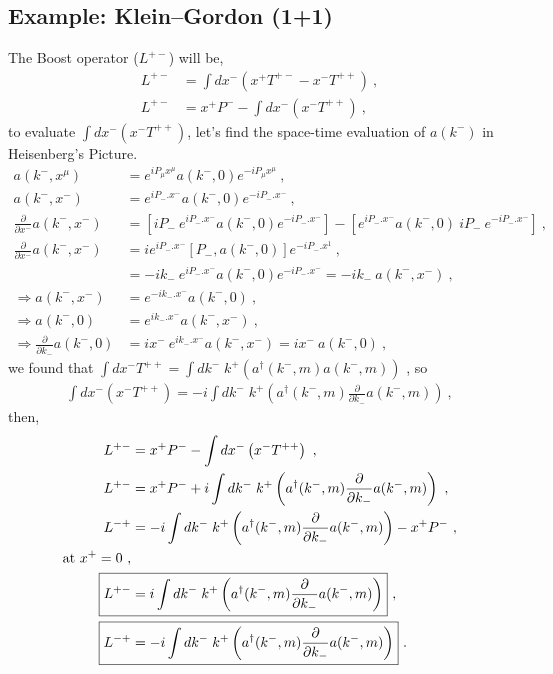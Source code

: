 \documentclass[12pt,a4paper]{report}
\begin{document}
\subsection{Example: Klein–Gordon (1+1)}
The Boost operator ($L^{+-}$) will be,	\cite{Chang}
     \begin{align}
       L^{+-}&=\int dx^-\left(x^{+ }T^{+- }-x^{- }T^{++ } \right)~, \nonumber\\
       L^{+-}&=x^+P^--\int dx^-\left(x^- T^{++} \right)~,
      \end{align}
to evaluate $\int dx^-\left(x^- T^{++} \right) \nonumber$, let's find the space-time evaluation of $a(k^-)$ in Heisenberg's Picture. \cite{Riccardo}
   \begin{align}
       a(k^-,x^\mu)&=e^{iP_\mu x^\mu}a(k^-,0)e^{-iP_\mu x^\mu}~,\nonumber\\
       a(k^-,x^-)&=e^{iP_-. x^-}a(k^-,0)e^{-iP_-.x^-}~,\nonumber\\
       \frac{\partial}{\partial x^-}a(k^-,x^-)&=[iP_-~e^{iP_-. x^-}a(k^-,0)e^{-iP_-.x^-}]-[e^{iP_-. x^-}a(k^-,0)~iP_-~e^{-iP_-.x^-}]\nonumber~,\\
       \frac{\partial}{\partial x^-}a(k^-,x^-)&=ie^{iP_-. x^-}\left[P_-,a(k^-,0)\right]e^{-iP_-.x^1}\nonumber~,\\
       &=-ik_-~e^{iP_-.x^-}a(k^-,0)e^{-iP_-.x^-}=-ik_-~a(k^-,x^-)\nonumber~,\\
       \Longrightarrow a(k^-,x^-)&=e^{-ik_-.x^-}a(k^-,0)\nonumber~,\\
       \Longrightarrow a(k^-,0)&=e^{ik_-.x^-}a(k^-,x^-)\nonumber~,\\
       \Longrightarrow \frac{\partial}{\partial k_-}a(k^-,0)&=ix^-~e^{ik_-.x^-}a(k^-,x^-)=ix^-~a(k^-,0)\nonumber~,
   \end{align}
we found that $\int dx^- T^{++}=\int dk^- \;k^+\left (a^{\dagger}(k^-,m)a(k^-,m)\right)$ , so
  \begin{align}
      \int dx^-\left(x^- T^{++} \right)=-i\int dk^- \;k^+\left (a^{\dagger}(k^-,m)\frac{\partial}{\partial k_-}a(k^-,m)\right)~,
  \end{align}
  then,
   \begin{align}
     L^{+-}&=x^+ P^--\int dx^-\left(x^- T^{++} \right)\nonumber~,\\
     L^{+-}&=x^+P^-+i\int dk^- \;k^+\left (a^{\dagger}(k^-,m)\frac{\partial}{\partial k_-}a(k^-,m)\right) ~,\\
     L^{-+}&=-i\int dk^- \;k^+\left (a^{\dagger}(k^-,m)\frac{\partial}{\partial k_-}a(k^-,m)\right)-x^+P^- ~,\\
     \text{at $x^+=0$~,}&\nonumber\\
     \Aboxed{L^{+-}&=i\int dk^- \;k^+\left (a^{\dagger}(k^-,m)\frac{\partial}{\partial k_-}a(k^-,m)\right)} ~, \\
     \Aboxed{L^{-+}&=-i\int dk^- \;k^+\left (a^{\dagger}(k^-,m)\frac{\partial}{\partial k_-}a(k^-,m)\right)}~.
   \end{align}
\end{document}

